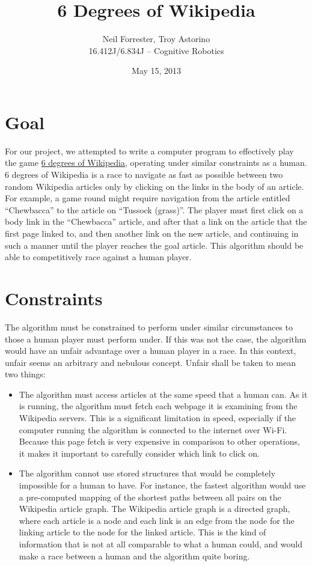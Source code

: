 \documentclass{article}
\title{6 Degrees of Wikipedia}
\author{Neil Forrester, Troy Astorino \\ 16.412J/6.834J -- Cognitive Robotics}
\date{May 15, 2013}
\begin{document}
\maketitle
\doublespacing
\tableofcontents
\section{Goal}
For our project, we attempted to write a computer program to effectively play the game
\href{http://en.wikipedia.org/wiki/Wikipedia:Six_degrees_of_Wikipedia}{6 degrees of Wikipedia},
operating under similar constraints as a human.
6 degrees of Wikipedia is a race to navigate as fast as possible between two
random Wikipedia articles only by clicking on the links in the body of an article.
For example, a game round might require navigation from the article entitled ``Chewbacca'' to the article on ``Tussock (grass)''.
The player must first click on a body link in the ``Chewbacca'' article,
and after that a link on the article that the first page linked to,
and then another link on the new article,
and continuing in such a manner until the player reaches the goal article.
This algorithm should be able to competitively race against a human player.

\section{Constraints}
The algorithm must be constrained to perform under similar circumstances to
those a human player must perform under. If this was not the case, the algorithm
would have an unfair advantage over a human player in a race. In this context,
unfair seems an arbitrary and nebulous concept. Unfair shall be taken to mean
two things:

\begin{itemize}
\item The algorithm must access articles at the same speed that a human can. As
  it is running, the algorithm must fetch each webpage it is examining from the
  Wikipedia servers. This is a significant limitation in speed, especially if
  the computer running the algorithm is connected to the internet over Wi-Fi.
  Because this page fetch is very expensive in comparison to other operations,
  it makes it important to carefully consider which link to click on.

\item The algorithm cannot use stored structures that would be completely
  impossible for a human to have. For instance, the fastest algorithm would use
  a pre-computed mapping of the shortest paths between all pairs on the Wikipedia
  article graph. The Wikipedia article graph is a directed graph, where each
  article is a node and each link is an edge from the node for the linking
  article to the node for the linked article. This is the kind of information
  that is not at all comparable to what a human could, and would make a race
  between a human and the algorithm quite boring. 
\end{itemize}
\end{document}
